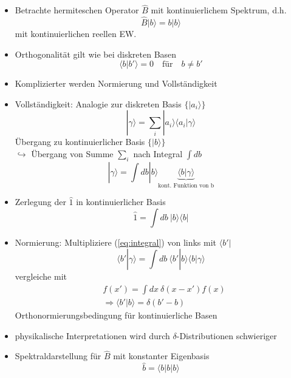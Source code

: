 \documentclass[10pt,article,colorback,accentcolor=tud9d]{scrartcl}
\begin{document}
\begin{itemize}
	\item Betrachte hermiteschen Operator $\hat{B}$ mit kontinuierlichem Spektrum, d.h.
    \begin{equation}
    \hat{B}|b\rangle =b|b\rangle
    \end{equation}
    mit kontinuierlichen reellen EW.
  \item Orthogonalität gilt wie bei diskreten Basen
    \begin{equation}
      \langle b|b'\rangle=0 \quad \text{für} \quad b\neq b'
    \end{equation}
  \item Komplizierter werden Normierung und Vollständigkeit
  \item Vollständigkeit: Analogie zur diskreten Basis $\{|a_i\rangle\}$
    \begin{equation}
      |\gamma\rangle =\sum_i|a_i\rangle \langle a_i|\gamma\rangle
    \end{equation}
    Übergang zu kontinuierlicher Basis $\{|b\rangle\}$\\ 
    $\hookrightarrow$ Übergang von Summe $\sum_i$ nach Integral $\int db$
    \begin{equation}
    |\gamma\rangle = \int db |b\rangle \underbrace{\langle b|\gamma\rangle}_{\text{kont. Funktion von b}}
    \label{eq:integral}
    \end{equation}
  \item Zerlegung der $\hat{1}$ in kontinuierlicher Basis
    \begin{equation}
      \hat{1} = \int db\ |b\rangle\langle b|
    \end{equation}
  \item Normierung: Multipliziere (\ref{eq:integral}) von links mit $\langle b'|$
    \begin{equation}
      \langle b'|\gamma\rangle =\int db\ \langle b'|b\rangle\langle b |\gamma\rangle
    \end{equation}
    vergleiche mit
    \begin{equation}
    \begin{aligned}
    &f(x') =\int dx\ \delta(x-x')f(x)\\
    &\Rightarrow \langle b'|b\rangle = \delta(b'-b)
    \end{aligned}
    \end{equation}
    Orthonormierungsbedingung für kontinuierliche Basen
  \item physikalische Interpretationen wird durch $\delta$-Distributionen schwieriger
  \item Spektraldarstellung für $\hat{B}$ mit konstanter Eigenbasis
    \begin{equation}
    \hat{b}=\langle b|b|b\rangle %
    \end{equation}
\end{itemize}
\end{document}
